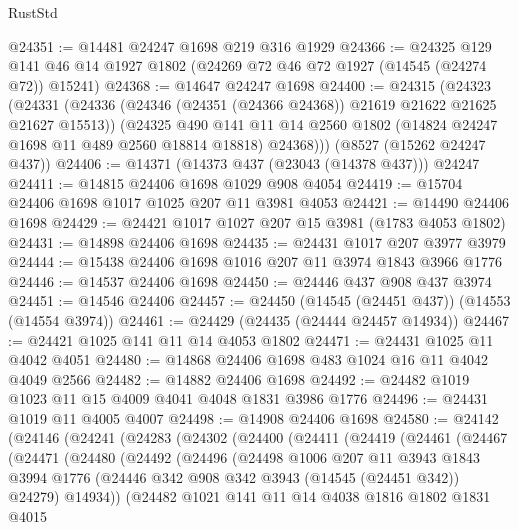 \begin{lexlean}{RustStd}
\begin{coremodule}
@24351 := @14481 @24247 @1698 @219 @316 @1929
@24366 := @24325
    @129
    @141
    @46
    @14
    @1927
    @1802
    (@24269 @72 @46 @72 @1927 (@14545 (@24274 @72)) @15241)
@24368 := @14647 @24247 @1698
@24400 := @24315
    (@24323
      (@24331
        (@24336 (@24346 (@24351 (@24366 @24368)) @21619 @21622 @21625 @21627 @15513))
        (@24325
          @490
          @141
          @11
          @14
          @2560
          @1802
          (@14824 @24247 @1698 @11 @489 @2560 @18814 @18818)
          @24368)))
    (@8527 (@15262 @24247 @437))
@24406 := @14371 (@14373 @437 (@23043 (@14378 @437))) @24247
@24411 := @14815 @24406 @1698 @1029 @908 @4054
@24419 := @15704 @24406 @1698 @1017 @1025 @207 @11 @3981 @4053
@24421 := @14490 @24406 @1698
@24429 := @24421 @1017 @1027 @207 @15 @3981 (@1783 @4053 @1802)
@24431 := @14898 @24406 @1698
@24435 := @24431 @1017 @207 @3977 @3979
@24444 := @15438 @24406 @1698 @1016 @207 @11 @3974 @1843 @3966 @1776
@24446 := @14537 @24406 @1698
@24450 := @24446 @437 @908 @437 @3974
@24451 := @14546 @24406
@24457 := @24450 (@14545 (@24451 @437)) (@14553 (@14554 @3974))
@24461 := @24429 (@24435 (@24444 @24457 @14934))
@24467 := @24421 @1025 @141 @11 @14 @4053 @1802
@24471 := @24431 @1025 @11 @4042 @4051
@24480 := @14868 @24406 @1698 @483 @1024 @16 @11 @4042 @4049 @2566
@24482 := @14882 @24406 @1698
@24492 := @24482 @1019 @1023 @11 @15 @4009 @4041 @4048 @1831 @3986 @1776
@24496 := @24431 @1019 @11 @4005 @4007
@24498 := @14908 @24406 @1698
@24580 := @24142
    (@24146
      (@24241
        (@24283
          (@24302
            (@24400
              (@24411
                (@24419
                  (@24461
                    (@24467
                      (@24471
                        (@24480
                          (@24492
                            (@24496
                              (@24498
                                @1006
                                @207
                                @11
                                @3943
                                @1843
                                @3994
                                @1776
                                (@24446 @342 @908 @342 @3943 (@14545 (@24451 @342)) @24279)
                                @14934))
                            (@24482
                              @1021
                              @141
                              @11
                              @14
                              @4038
                              @1816
                              @1802
                              @1831
                              @4015

\end{coremodule}
\end{lexlean}
